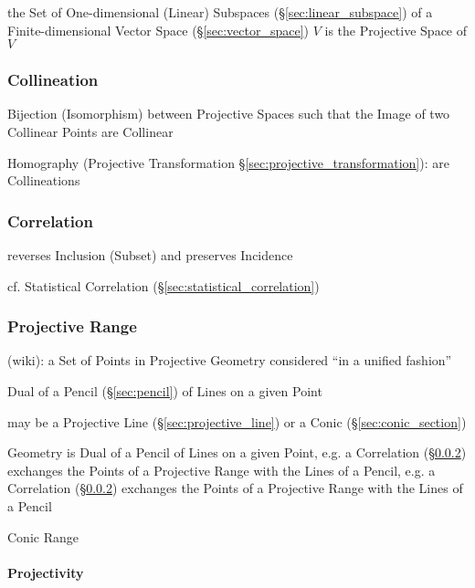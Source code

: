 \fist the Set of One-dimensional (Linear) Subspaces
(\S\ref{sec:linear_subspace}) of a Finite-dimensional Vector Space
(\S\ref{sec:vector_space}) $V$ is the Projective Space of $V$



\subsubsection{Collineation}\label{sec:collineation}

Bijection (Isomorphism) between Projective Spaces such that the Image of two
Collinear Points are Collinear

\fist Homography (Projective Transformation
\S\ref{sec:projective_transformation}): are Collineations %



\subsubsection{Correlation}\label{sec:correlation}

reverses Inclusion (Subset) and preserves Incidence

\fist cf. Statistical Correlation (\S\ref{sec:statistical_correlation})



\subsubsection{Projective Range}\label{sec:projective_range}

(wiki): a Set of Points in Projective Geometry considered ``in a unified
fashion''

Dual of a Pencil (\S\ref{sec:pencil}) of Lines on a given Point

may be a Projective Line (\S\ref{sec:projective_line}) or a Conic
(\S\ref{sec:conic_section})

Geometry is Dual of a Pencil of Lines on a given Point, e.g. a Correlation
(\S\ref{sec:correlation}) exchanges the Points of a Projective Range with the
Lines of a Pencil, e.g. a Correlation (\S\ref{sec:correlation}) exchanges the
Points of a Projective Range with the Lines of a Pencil

Conic Range



\paragraph{Projectivity}\label{sec:projectivity}\hfill



